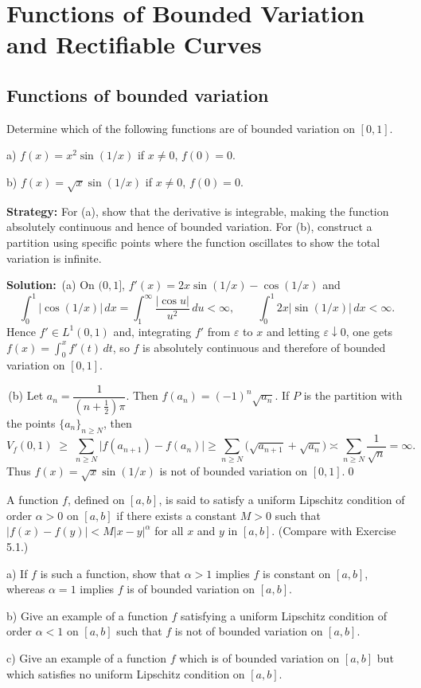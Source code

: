 \chapter{Functions of Bounded Variation and Rectifiable Curves}

\section{Functions of bounded variation}


\begin{problembox}
Determine which of the following functions are of bounded variation on $[0, 1]$.

a) $f(x) = x^2 \sin (1/x)$ if $x \neq 0$, $f(0) = 0$.

b) $f(x) = \sqrt{x} \sin (1/x)$ if $x \neq 0$, $f(0) = 0$.
\end{problembox}

\noindent\textbf{Strategy:} For (a), show that the derivative is integrable, making the function absolutely continuous and hence of bounded variation. For (b), construct a partition using specific points where the function oscillates to show the total variation is infinite.

\bigskip\noindent\textbf{Solution:}
\,(a) On $(0,1]$, $f'(x)=2x\sin(1/x)-\cos(1/x)$ and
\[\int_0^1 |\cos(1/x)|\,dx=\int_1^{\infty}\frac{|\cos u|}{u^2}\,du<\infty,\qquad \int_0^1 2x|\sin(1/x)|\,dx<\infty.
\]
Hence $f'\in L^1(0,1)$ and, integrating $f'$ from $\varepsilon$ to $x$ and letting $\varepsilon\downarrow 0$, one gets $f(x)=\int_0^x f'(t)\,dt$, so $f$ is absolutely continuous and therefore of bounded variation on $[0,1]$.

\,(b) Let $a_n=\dfrac{1}{(n+\tfrac12)\pi}$. Then $f(a_n)=(-1)^n\sqrt{a_n}$. If $P$ is the partition with the points $\{a_n\}_{n\ge N}$, then
\[V_f(0,1)\;\ge\;\sum_{n\ge N}\big|f(a_{n+1})-f(a_n)\big|\ge \sum_{n\ge N}\big(\sqrt{a_{n+1}}+\sqrt{a_n}\big)\asymp\sum_{n\ge N}\frac{1}{\sqrt{n}}=\infty.
\]
Thus $f(x)=\sqrt{x}\sin(1/x)$ is not of bounded variation on $[0,1]$.\qed


\begin{problembox}
A function $f$, defined on $[a, b]$, is said to satisfy a uniform Lipschitz condition of order $\alpha > 0$ on $[a, b]$ if there exists a constant $M > 0$ such that $|f(x) - f(y)| < M |x - y|^\alpha$ for all $x$ and $y$ in $[a, b]$. (Compare with Exercise 5.1.)

a) If $f$ is such a function, show that $\alpha > 1$ implies $f$ is constant on $[a, b]$, whereas $\alpha = 1$ implies $f$ is of bounded variation on $[a, b]$.

b) Give an example of a function $f$ satisfying a uniform Lipschitz condition of order $\alpha < 1$ on $[a, b]$ such that $f$ is not of bounded variation on $[a, b]$.

c) Give an example of a function $f$ which is of bounded variation on $[a, b]$ but which satisfies no uniform Lipschitz condition on $[a, b]$.
\end{problembox}

